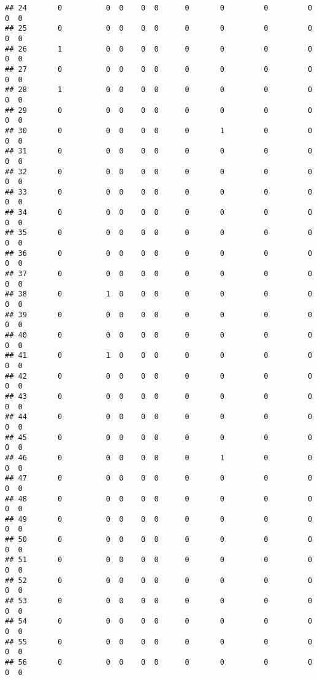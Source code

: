 \documentclass[
]{article}
\begin{document}
\begin{verbatim}
## 24       0          0  0    0  0      0       0         0         0    0  0
## 25       0          0  0    0  0      0       0         0         0    0  0
## 26       1          0  0    0  0      0       0         0         0    0  0
## 27       0          0  0    0  0      0       0         0         0    0  0
## 28       1          0  0    0  0      0       0         0         0    0  0
## 29       0          0  0    0  0      0       0         0         0    0  0
## 30       0          0  0    0  0      0       1         0         0    0  0
## 31       0          0  0    0  0      0       0         0         0    0  0
## 32       0          0  0    0  0      0       0         0         0    0  0
## 33       0          0  0    0  0      0       0         0         0    0  0
## 34       0          0  0    0  0      0       0         0         0    0  0
## 35       0          0  0    0  0      0       0         0         0    0  0
## 36       0          0  0    0  0      0       0         0         0    0  0
## 37       0          0  0    0  0      0       0         0         0    0  0
## 38       0          1  0    0  0      0       0         0         0    0  0
## 39       0          0  0    0  0      0       0         0         0    0  0
## 40       0          0  0    0  0      0       0         0         0    0  0
## 41       0          1  0    0  0      0       0         0         0    0  0
## 42       0          0  0    0  0      0       0         0         0    0  0
## 43       0          0  0    0  0      0       0         0         0    0  0
## 44       0          0  0    0  0      0       0         0         0    0  0
## 45       0          0  0    0  0      0       0         0         0    0  0
## 46       0          0  0    0  0      0       1         0         0    0  0
## 47       0          0  0    0  0      0       0         0         0    0  0
## 48       0          0  0    0  0      0       0         0         0    0  0
## 49       0          0  0    0  0      0       0         0         0    0  0
## 50       0          0  0    0  0      0       0         0         0    0  0
## 51       0          0  0    0  0      0       0         0         0    0  0
## 52       0          0  0    0  0      0       0         0         0    0  0
## 53       0          0  0    0  0      0       0         0         0    0  0
## 54       0          0  0    0  0      0       0         0         0    0  0
## 55       0          0  0    0  0      0       0         0         0    0  0
## 56       0          0  0    0  0      0       0         0         0    0  0

\end{verbatim}
\end{document}
